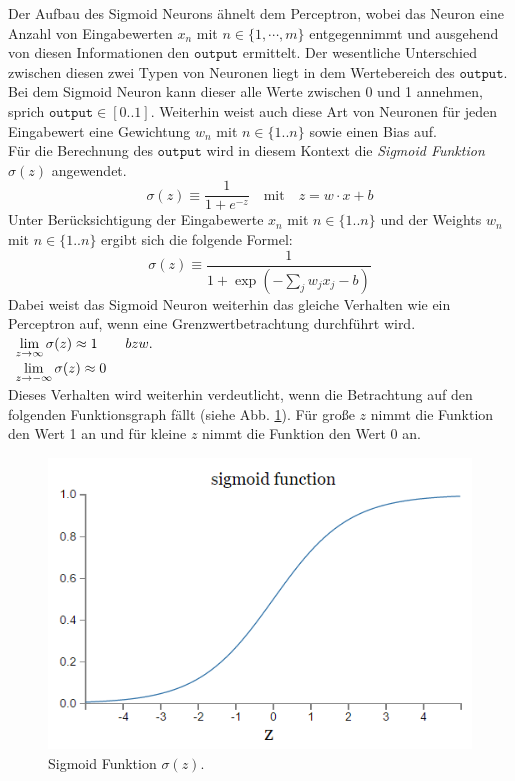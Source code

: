 \noindent
Der Aufbau des Sigmoid Neurons ähnelt dem Perceptron, wobei das Neuron eine Anzahl von Eingabewerten $x_n$ mit $n \in \{1, \cdots ,m\}$ entgegennimmt und ausgehend von diesen Informationen den $\mathtt{output}$ ermittelt. Der wesentliche Unterschied zwischen diesen zwei Typen von Neuronen liegt in dem Wertebereich des $\mathtt{output}$. Bei dem Sigmoid Neuron kann dieser alle Werte zwischen 0 und 1 annehmen, sprich $\mathtt{output} \in [0 .. 1]$. Weiterhin weist auch diese Art von Neuronen für jeden Eingabewert eine Gewichtung $w_n$ mit $n \in \{1 .. n\}$ sowie einen Bias auf. \\
Für die Berechnung des $\mathtt{output}$ wird in diesem Kontext die \textit{Sigmoid Funktion} $\sigma(z)$ angewendet.
\begin{equation}
	\sigma(z) \equiv \frac{1}{1+e^{-z}} \quad\mbox{mit}\quad z = w \cdot x + b
\end{equation}
Unter Berücksichtigung der Eingabewerte $x_n$ mit $n \in \{1 .. n\}$ und der Weights  $w_n$ mit $n \in \{1 .. n\}$ ergibt sich die folgende Formel:
\begin{equation}
	\sigma(z) \equiv \frac{1}{1+\exp(-\sum_j w_j x_j - b)}
\end{equation}
Dabei weist das Sigmoid Neuron weiterhin das gleiche Verhalten wie ein Perceptron auf, wenn eine Grenzwertbetrachtung durchführt wird. \\[0.2cm]
\hspace*{1.3cm}
$
\begin{array}[t]{lcll}
	\lim\limits_{z \to \infty}{\sigma(z)} \approx 1 \quad\quad bzw. \\[0.2cm]
	\lim\limits_{z \to -\infty}{ \sigma(z)} \approx 0
\end{array}
$
\\[0.2cm]
Dieses Verhalten wird weiterhin verdeutlicht, wenn die Betrachtung auf den folgenden Funktionsgraph fällt (siehe Abb. \ref{fig:sigmoid_plot}). Für große $z$ nimmt die Funktion den Wert 1 an und für kleine $z$ nimmt die Funktion den Wert 0 an.
\begin{figure}[hbt]
	\centering
	\includegraphics[scale=0.6]{Bilder/sigmoid_plot}
	\caption{Sigmoid Funktion $\sigma(z)$.} 
	\label{fig:sigmoid_plot} 
\end{figure}


